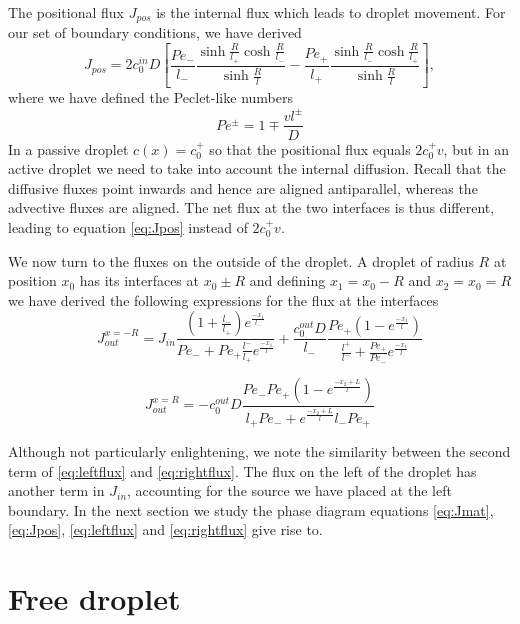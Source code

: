 \documentclass{Dissertate}
\begin{document}
The positional flux \(J_{pos}\) is the internal flux which leads to
droplet movement. For our set of boundary conditions, we have derived
\begin{equation}
J_{pos} = 2c_0^{in}D\left[\frac{Pe_-}{l_-}\frac{\sinh\frac{R}{l_+}\cosh\frac{R}{l_-}}{\sinh\frac{R}{l}}-\frac{Pe_+}{l_+}\frac{\sinh\frac{R}{l_-}\cosh\frac{R}{l_+}}{\sinh\frac{R}{l}}\right],
\label{eq:Jpos}\end{equation} where we have defined the Peclet-like
numbers \[
Pe^\pm = 1 \mp \frac{vl^\pm}{D}
\] In a passive droplet \(c(x)=c_0^+\) so that the positional flux
equals \(2c_0^+v\), but in an active droplet we need to take into
account the internal diffusion. Recall that the diffusive fluxes point
inwards and hence are aligned antiparallel, whereas the advective
fluxes are aligned. The net flux at the two interfaces is thus
different, leading to equation \ref{eq:Jpos} instead of \(2c_0^+v\).

We now turn to the fluxes on the outside of the droplet. A droplet of
radius \(R\) at position \(x_0\) has its interfaces at \(x_0 \pm R\) and
defining \(x_1=x_0-R\) and \(x_2=x_0=R\) we have derived the following
expressions for the flux at the interfaces \begin{equation}
J_{out}^{x=-R} = J_{in}\frac{(1+\frac{l_-}{l_+})e^{\frac{-x_1}{l_-}}}{Pe_-+Pe_+\frac{l^-}{l_+}e^{\frac{-x_1}{l}}}
+\frac{c_0^{out}D}{l_-}\frac{Pe_+(1-e^{\frac{-x_1}{l}})}{\frac{l^+}{l^-}+\frac{Pe_+}{Pe_-}e^{\frac{-x_1}{l}}}
\label{eq:leftflux}\end{equation}

\begin{equation}
J_{out}^{x=R} = -c_0^{out}D\frac{Pe_-Pe_+(1-e^{\frac{-x_2+L}{l}})}{l_+Pe_-+e^{\frac{-x_2+L}{l}}l_-Pe_+}
\label{eq:rightflux}\end{equation}

Although not particularly enlightening, we note the similarity between
the second term of \ref{eq:leftflux} and \ref{eq:rightflux}. The
flux on the left of the droplet has another term in \(J_{in}\),
accounting for the source we have placed at the left boundary. In the
next section we study the phase diagram equations \ref{eq:Jmat},
\ref{eq:Jpos}, \ref{eq:leftflux} and \ref{eq:rightflux} give
rise to.

\hypertarget{free-droplet}{%
\section{Free droplet}\label{free-droplet}}
\end{document}
